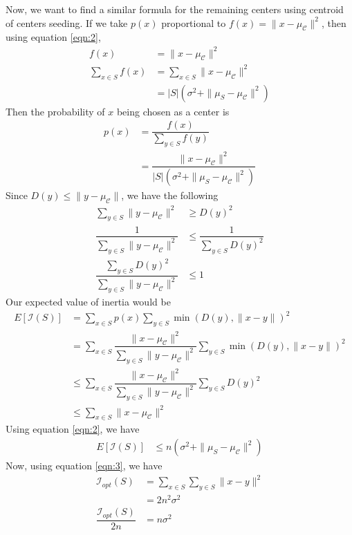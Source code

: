 \documentclass[twoside, 11pt]{article}
\newcommand{\C}{\mathcal{C}}
\newcommand{\I}{\mathcal{I}}
\begin{document}
	Now, we want to find a similar formula for the remaining centers using centroid of centers seeding. If we take $p(x)$ proportional to $f(x)=\|x-\mu_{\C}\|^2$, then using equation \eqref{eqn:2},
		\begin{align*}
			f(x) & = \|x-\mu_{\C}\|^2\\
			\sum_{x\in S}f(x) 
				& = \sum_{x\in S}\|x-\mu_{\C}\|^2\\
				& = |S|(\sigma^2+\|\mu_S-\mu_{\C}\|^2)
		\end{align*}
	Then the probability of $x$ being chosen as a center is
		\begin{align*}
			p(x) & = \dfrac{f(x)}{\sum_{y\in S}f(y)}\\
				 & = \dfrac{\|x-\mu_{\C}\|^2}{|S|(\sigma^2+\|\mu_{S}-\mu_{\C}\|^2)}
		\end{align*}
	Since $D(y)\leq \|y-\mu_{\C}\|$, we have the following
		\begin{align*}
			\sum_{y\in S}\|y-\mu_{\C}\|^2 & \geq D(y)^2\\
			\dfrac{1}{\sum_{y\in S}\|y-\mu_{\C}\|^2} & \leq \dfrac{1}{\sum_{y\in S}D(y)^2}\\
			\dfrac{\sum_{y\in S}D(y)^2}{\sum_{y\in S}\|y-\mu_{\C}\|^2} & \leq 1
		\end{align*}
	Our expected value of inertia would be
		\begin{align*}
			E[\I(S)] & = \sum_{x\in S}p(x)\sum_{y\in S}\min(D(y),\|x-y\|)^2\\
					   & = \sum_{x\in S}\dfrac{\|x-\mu_{\C}\|^2}{\sum_{y\in S}\|y-\mu_{\C}\|^2}\sum_{y\in S}\min(D(y),\|x-y\|)^2\\
					   & \leq \sum_{x\in S}\dfrac{\|x-\mu_{\C}\|^2}{\sum_{y\in S}\|y-\mu_{\C}\|^2}\sum_{y\in S}D(y)^2\\
					   & \leq \sum_{x\in S}\|x-\mu_{\C}\|^2
		\end{align*}
	Using equation \eqref{eqn:2}, we have
		\begin{align*}
			E[\I(S)] & \leq n(\sigma^2+\|\mu_S-\mu_{\C}\|^2)
		\end{align*}
	Now, using equation \eqref{eqn:3}, we have
		\begin{align*}
			\I_{opt}(S) & = \sum_{x\in S}\sum_{y\in S}\|x-y\|^2\\
						  & = 2n^2\sigma^2\\
			\dfrac{\I_{opt}(S)}{2n} & = n\sigma^2
		\end{align*}
\end{document}
